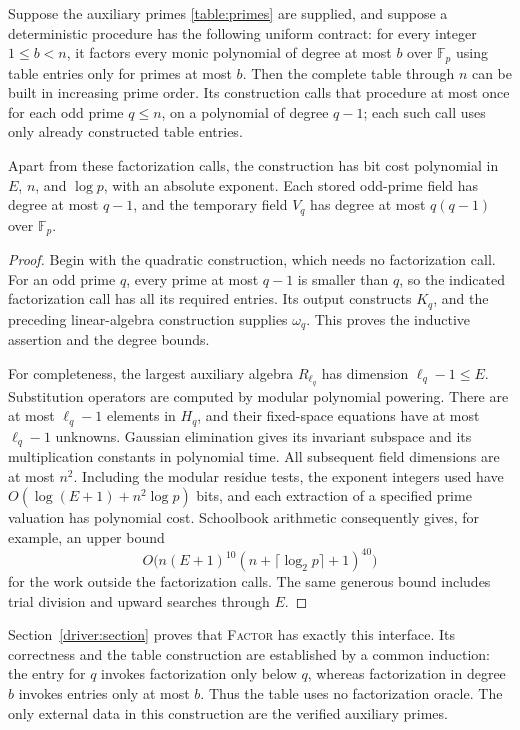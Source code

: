 \begin{proposition}\label{table:construction}
Suppose the auxiliary primes \eqref{table:primes} are supplied, and
suppose a deterministic procedure has the following uniform contract:
for every integer $1\le b<n$, it factors every monic polynomial of degree at
most $b$ over $\mathbb F_p$ using table entries only for primes at most
$b$.  Then the complete table through $n$ can be built in increasing
prime order.  Its construction calls that procedure at most once for each
odd prime $q\le n$, on a polynomial of degree $q-1$; each such call uses
only already constructed table entries.

Apart from these factorization calls, the construction has bit cost
polynomial in $E$, $n$, and $\log p$, with an absolute exponent.  Each
stored odd-prime field has degree at most $q-1$, and the temporary field
$V_q$ has degree at most $q(q-1)$ over $\mathbb F_p$.
\end{proposition}
\begin{proof}
Begin with the quadratic construction, which needs no factorization call.
For an odd prime $q$, every prime at most $q-1$ is smaller than $q$, so
the indicated factorization call has all its required entries.  Its output
constructs $K_q$, and the preceding linear-algebra construction supplies
$\omega_q$.  This proves the inductive assertion and the degree bounds.

For completeness, the largest auxiliary algebra $R_{\ell_q}$ has
dimension $\ell_q-1\le E$.  Substitution operators are computed by
modular polynomial powering.  There are at most $\ell_q-1$ elements in
$H_q$, and their fixed-space equations have at most $\ell_q-1$
unknowns.  Gaussian elimination gives its invariant subspace and its
multiplication constants in polynomial time.  All subsequent field
dimensions are at most $n^2$.  Including the modular residue tests, the exponent integers used have
$O(\log(E+1)+n^2\log p)$ bits, and each extraction of a specified prime valuation
has polynomial cost.  Schoolbook arithmetic consequently gives, for
example, an upper bound
\[
 O\bigl(n(E+1)^{10}(n+\lceil\log_2p\rceil+1)^{40}\bigr)
\]
for the work outside the factorization calls.  The same generous bound
includes trial division and upward searches through $E$.
\end{proof}

Section~\ref{driver:section} proves that \textsc{Factor} has exactly this
interface.  Its correctness and the table construction are established
by a common induction: the entry for $q$ invokes factorization only below
$q$, whereas factorization in degree $b$ invokes entries only at most
$b$.  Thus the table uses no factorization oracle.  The only external
data in this construction are the verified auxiliary primes.
